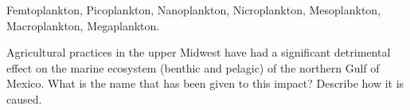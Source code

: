 \documentclass[11pt]{exam}
\begin{document}
\begin{questions}
\begin{solution}
Femtoplankton, Picoplankton, Nanoplankton, Nicroplankton, Mesoplankton, Macroplankton, Megaplankton.
\end{solution}

\newpage
\question[15]
Agricultural practices in the upper Midwest have had a significant detrimental effect on the marine ecosystem (benthic and pelagic) of the northern Gulf of Mexico. What is the name that has been given to this impact? Describe how it is caused.

\end{questions}
\end{document}
